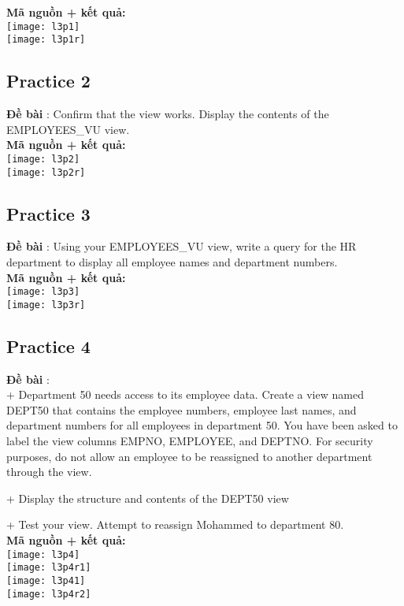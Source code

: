 \documentclass[a4paper]{report}
\begin{document}
\textbf{Mã nguồn + kết quả: }\\
\texttt{[image: l3p1]}\\
\texttt{[image: l3p1r]}
\subsection{Practice 2}
\noindent
\textbf{Đề bài} : Confirm that the view works. Display the contents of the EMPLOYEES\_VU view.\\

\textbf{Mã nguồn + kết quả: }\\
\texttt{[image: l3p2]}\\
\texttt{[image: l3p2r]}
\subsection{Practice 3}
\noindent
\textbf{Đề bài} : Using your EMPLOYEES\_VU view, write a query for the HR department to display all employee names and department numbers.\\

\textbf{Mã nguồn + kết quả: }\\
\texttt{[image: l3p3]}\\
\texttt{[image: l3p3r]}
\subsection{Practice 4}
\noindent
\textbf{Đề bài} : \\
+ Department 50 needs access to its employee data. Create a view named DEPT50 that contains the employee numbers, employee last names, and department numbers for all employees in department 50. You have been asked to label the view columns EMPNO, EMPLOYEE, and DEPTNO. For security purposes, do not allow an employee to be reassigned to another department through the view.\par
+ Display the structure and contents of the DEPT50 view \par
+ Test your view. Attempt to reassign Mohammed to department 80.\\

\textbf{Mã nguồn + kết quả: }\\
\texttt{[image: l3p4]}\\
\texttt{[image: l3p4r1]}\\
\texttt{[image: l3p41]}\\
\texttt{[image: l3p4r2]}
\end{document}
